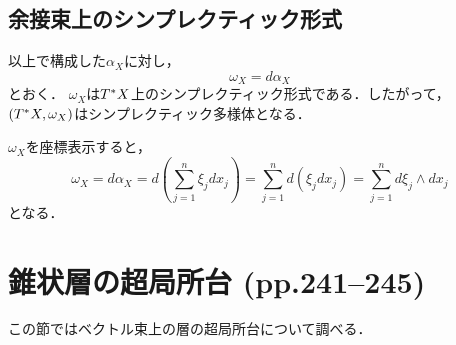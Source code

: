 \subsection*{余接束上のシンプレクティック形式}
以上で構成した\(\alpha_X\)に対し，\[\omega_X=d\alpha_X\]とおく．
\(\omega_X\)は\(\cotb[X]\)上のシンプレクティック形式である．したがって，
\((\cotb[X],\omega_X)\)はシンプレクティック多様体となる．

\(\omega_X\)を座標表示すると，
\[
    \omega_X=d\alpha_{X}
    =d\left(\sum_{j=1}^{n}\xi_{j}dx_{j}\right)
    =\sum_{j=1}^{n}d(\xi_{j}dx_{j})
    =\sum_{j=1}^{n}d\xi_{j}\wedge dx_{j}
\]
となる．

\section{錐状層の超局所台 (pp.241--245)}
\newcommand{\eu}{\mathbf{e}}
\newcommand{\rrp}{\rr^{+}}

この節ではベクトル束上の層の超局所台について調べる．

